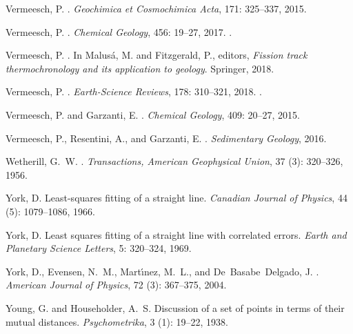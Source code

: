 \documentclass{article}
\begin{document}
\begin{thebibliography}{78}
Vermeesch, P.
.
\newblock \emph{Geochimica et Cosmochimica Acta}, 171: 325--337, 2015.

Vermeesch, P.
.
\newblock \emph{Chemical Geology}, 456: 19--27, 2017.
\newblock {}.

Vermeesch, P.
.
\newblock In Malus\'{a}, M. and Fitzgerald, P., editors, \emph{Fission track
  thermochronology and its application to geology}. Springer,
  2018{}.

Vermeesch, P.
.
\newblock \emph{Earth-Science Reviews}, 178: 310--321,
  2018{}.
\newblock {}.

Vermeesch, P. and Garzanti, E.
.
\newblock \emph{Chemical Geology}, 409: 20--27, 2015.

Vermeesch, P., Resentini, A., and Garzanti, E.
.
\newblock \emph{Sedimentary Geology}, 2016.

Wetherill, G.~W.
.
\newblock \emph{Transactions, American Geophysical Union}, 37
  (3): 320--326, 1956.

York, D.
\newblock Least-squares fitting of a straight line.
\newblock \emph{Canadian Journal of Physics}, 44 (5):
  1079--1086, 1966.

York, D.
\newblock Least squares fitting of a straight line with correlated errors.
\newblock \emph{Earth and Planetary Science Letters}, 5: 320--324,
  1969.

York, D., Evensen, N.~M., Mart{\i}́nez, M.~L., and De~Basabe~Delgado, J.
.
\newblock \emph{American Journal of Physics}, 72 (3):
  367--375, 2004.

Young, G. and Householder, A.~S.
\newblock Discussion of a set of points in terms of their mutual distances.
\newblock \emph{Psychometrika}, 3 (1): 19--22, 1938.

\end{thebibliography}
\end{document}
